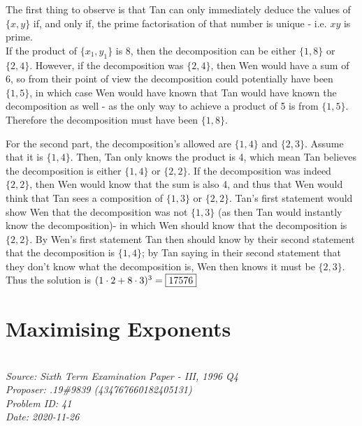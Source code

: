 \documentclass[titlepage=true]{scrartcl}
\begin{document}
    \begin{solution}\hfil\medskip 
     
        The first thing to observe is that Tan can only immediately deduce the values of \(\{x,y\}\) if, and only if, the prime factorisation of that number is unique - i.e. \(xy\) is prime.\\
        If the product of $\{x_1,y_1\}$ is 8, then the decomposition can be either $\{1,8\}$ or $\{2,4\}$. 
        However, if the decomposition was $\{2,4\}$, then Wen would have a sum of 6, so from their point of view the decomposition could potentially have been $\{1,5\}$, in which case Wen would have known that Tan would have known the decomposition as well - as the only way to achieve a product of 5 is from $\{1,5\}$. 
        Therefore the decomposition must have been $\{1,8\}$.
         
         For the second part, the decomposition's allowed are $\{1,4\}$ and $\{2,3\}$. 
         Assume that it is $\{1,4\}$. 
         Then, Tan only knows the product is 4, which mean Tan believes the decomposition is either $\{1,4\}$ or $\{2,2\}$. 
         If the decomposition was indeed $\{2,2\}$, then Wen would know that the sum is also 4, and thus that Wen would think that Tan sees a composition of $\{1,3\}$ or $\{2,2\}$. 
         Tan's first statement would show Wen that the decomposition was not $\{1,3\}$ (as then Tan would instantly know the decomposition)- in which Wen should know that the decomposition is $\{2,2\}$. 
         By Wen's first statement Tan then should know by their second statement that the decomposition is $\{1,4\}$; by Tan saying in their second statement that they don't know what the decomposition is, Wen then knows it must be $\{2,3\}$. 
         Thus the solution is \((1\cdot2+8\cdot3)^3 =\fbox{17576}\)
     \end{solution}

\newpage 
    
\section{Maximising Exponents}

        \SSbreak\\
        \emph{Source: Sixth Term Examination Paper - III, 1996 Q4}\\
        \emph{Proposer: .19\#9839 (434767660182405131)}\\
        \emph{Problem ID: 41}\\
        \emph{Date: 2020-11-26}\\
        \SSbreak
\end{document}
